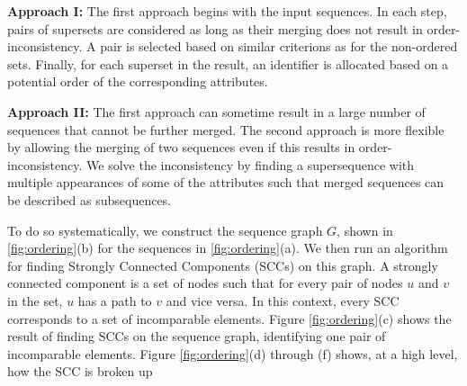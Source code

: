 \textbf{Approach I:} The first approach begins with the input sequences. In each step, pairs of supersets are considered as long as their merging does not result in order-inconsistency. A pair is selected based on similar criterions as for the non-ordered sets. Finally, for each superset in the result, an identifier is allocated based on a potential order of the corresponding attributes.

\textbf{Approach II:} The first approach can sometime result in a large number of sequences that cannot be further merged. The second approach is more flexible by allowing the merging of two sequences even if this results in order-inconsistency. We solve the inconsistency by finding a supersequence with multiple appearances of some of the attributes such that merged sequences can be described as subsequences. 

To do so systematically, we construct the sequence graph $G$, shown in \ref{fig:ordering}(b) for the sequences  in \ref{fig:ordering}(a). We then run an algorithm for finding Strongly Connected Components (SCCs) on this graph. A strongly connected component is a set of nodes such that for every pair of nodes $u$ and $v$ in the set, $u$ has a path to $v$ and vice versa. In this context, every SCC corresponds to a set of incomparable elements.  Figure \ref{fig:ordering}(c) shows the result of finding SCCs on the sequence graph, identifying one pair of incomparable elements. Figure \ref{fig:ordering}(d) through (f) shows, at a high level, how the SCC is broken up 

%



